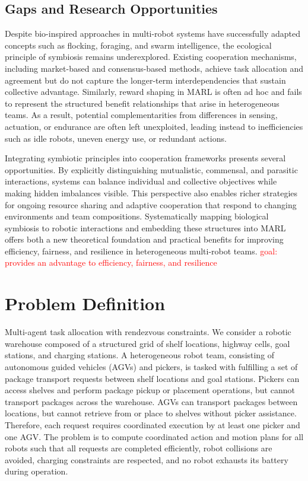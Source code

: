 \documentclass[Afour,sageh,times]{sagej}
\begin{document}
\subsection{Gaps and Research Opportunities}
Despite bio-inspired approaches in multi-robot systems have successfully adapted concepts such as flocking, foraging, and swarm intelligence, the ecological principle of symbiosis remains underexplored. Existing cooperation mechanisms, including market-based and consensus-based methods, achieve task allocation and agreement but do not capture the longer-term interdependencies that sustain collective advantage. Similarly, reward shaping in MARL is often ad hoc and fails to represent the structured benefit relationships that arise in heterogeneous teams. As a result, potential complementarities from differences in sensing, actuation, or endurance are often left unexploited, leading instead to inefficiencies such as idle robots, uneven energy use, or redundant actions.

Integrating symbiotic principles into cooperation frameworks presents several opportunities. By explicitly distinguishing mutualistic, commensal, and parasitic interactions, systems can balance individual and collective objectives while making hidden imbalances visible. This perspective also enables richer strategies for ongoing resource sharing and adaptive cooperation that respond to changing environments and team compositions. Systematically mapping biological symbiosis to robotic interactions and embedding these structures into MARL offers both a new theoretical foundation and practical benefits for improving efficiency, fairness, and resilience in heterogeneous multi-robot teams. \textcolor{red}{goal: provides an advantage to efficiency, fairness, and resilience}

\section{Problem Definition}
\label{sec:pre}

Multi-agent task allocation with rendezvous constraints. We consider a robotic warehouse composed of a structured grid of shelf locations, highway cells, goal stations, and charging stations. A heterogeneous robot team, consisting of autonomous guided vehicles (AGVs) and pickers, is tasked with fulfilling a set of package transport requests between shelf locations and goal stations. Pickers can access shelves and perform package pickup or placement operations, but cannot transport packages across the warehouse. AGVs can transport packages between locations, but cannot retrieve from or place to shelves without picker assistance. Therefore, each request requires coordinated execution by at least one picker and one AGV. The problem is to compute coordinated action and motion plans for all robots such that all requests are completed efficiently, robot collisions are avoided, charging constraints are respected, and no robot exhausts its battery during operation.
\end{document}
